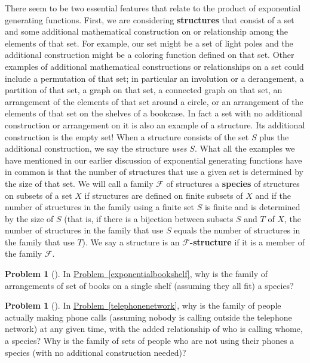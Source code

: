 \documentclass[10pt,]{book}
\newcommand{\terminology}[1]{\textbf{#1}}
\theoremstyle{plain}
\theoremstyle{definition}
\newtheorem{activity}[project]{Problem}
\theoremstyle{definition}
\numberwithin{equation}{chapter}
\newcommand{\F}{\mathcal{F}}
\begin{document}
There seem to be two essential features that relate to the product of exponential generating functions. First, we are considering \terminology{structures} that consist of a set and some additional mathematical construction on or relationship among the elements of that set. For example, our set might be a set of light poles and the additional construction might be a coloring function defined on that set. Other examples of additional mathematical constructions or relationships on a set could include a permutation of that set; in particular an involution or a derangement, a partition of that set, a graph on that set, a connected graph on that set, an arrangement of the elements of that set around a circle, or an arrangement of the elements of that set on the shelves of a bookcase. In fact a set with no additional construction or arrangement on it is also an example of a structure. Its additional construction is the empty set!  When a structure consists of the set \(S\) plus the additional construction, we say the structure \emph{uses} \(S\). What all the examples we have mentioned in our earlier discussion of exponential generating functions have in common is that the number of structures that use a given set is determined by the size of that set. We will call a family \(\F\) of structures a \terminology{species} of structures on subsets of a set \(X\) if structures are defined on finite subsets of \(X\) and if the number of structures in the family using a finite set \(S\) is finite and is determined by the size of \(S\) (that is, if there is a bijection between subsets \(S\) and \(T\) of \(X\), the number of structures in the family that use \(S\) equals the number of structures in the family that use \(T\)). We say a structure is an \terminology{\(\F\)-structure} if it is a member of the family \(\F\).%
\begin{activity}[] \label{activity-394}
In \hyperref[exponentialbookshelf]{Problem~\ref{exponentialbookshelf}}, why is the family of arrangements of set of books on a single shelf (assuming they all fit) a species?%
\end{activity}
\begin{activity}[] \label{activity-395}
In \hyperref[telephonenetwork]{Problem~\ref{telephonenetwork}}, why is the family of people actually making phone calls (assuming nobody is calling outside the telephone network) at any given time, with the added relationship of who is calling whome, a species? Why is the family of sets of people who are not using their phones a species (with no additional construction needed)?%
\end{activity}
\end{document}

